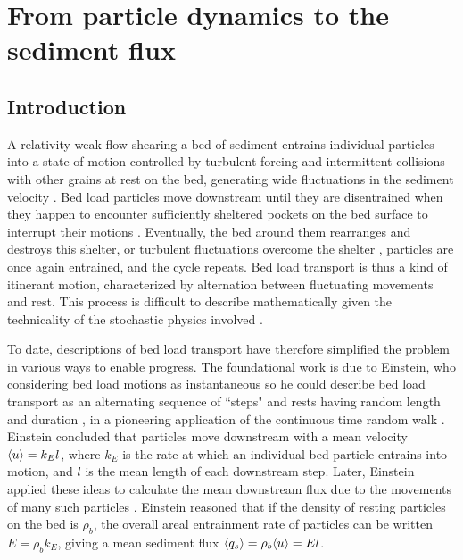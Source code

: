 
\chapter{From particle dynamics to the sediment flux}
\label{ch:flux}
\section{Introduction}

A relativity weak flow shearing a bed of sediment entrains individual particles into a state of motion controlled by turbulent forcing and intermittent collisions with other grains at rest on the bed, generating wide fluctuations in the sediment velocity \citep{Heyman2016,Fathel2015}.
Bed load particles move downstream until they are disentrained when they happen to encounter sufficiently sheltered pockets on the bed surface to interrupt their motions \citep{Charru2004,Gordon1972}.
Eventually, the bed around them rearranges and destroys this shelter, or turbulent fluctuations overcome the shelter \citep{Celik2019,Valyrakis2014}, particles are once again entrained, and the cycle repeats.
Bed load transport is thus a kind of itinerant motion, characterized by alternation between fluctuating movements and rest.
This process is difficult to describe mathematically given the technicality of the stochastic physics involved \citep{Furbish2017,Ancey2020}.

To date, descriptions of bed load transport have therefore simplified the problem in various ways to enable progress.
The foundational work is due to Einstein, who considering bed load motions as instantaneous so he could describe bed load transport as an alternating sequence of ``steps" and rests having random length and duration \citep{Einstein1937}, in a pioneering application of the continuous time random walk \citep{Montroll1965}.
Einstein concluded that particles move downstream with a mean velocity $\langle u \rangle = k_E l$, where $k_E$ is the rate at which an individual bed particle entrains into motion, and $l$ is the mean length of each downstream step.
Later, Einstein applied these ideas to calculate the mean downstream flux due to the movements of many such particles \citep{Einstein1950}. Einstein reasoned that if the density of resting particles on the bed is $\rho_b$, the overall areal entrainment rate of particles can be written $E = \rho_b k_E$, giving a mean sediment flux $\langle q_s \rangle = \rho_b \langle u \rangle  = El $.

